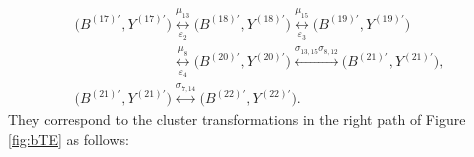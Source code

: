 \documentclass[pdftex]{sigma}
\newcommand\bY{Y}
\numberwithin{equation}{section}
\begin{document}
\begin{gather}
\bigl(B^{(17)\prime}, \bY^{(17)\prime}\bigr) \underset{\varepsilon_2}{\overset{\mu_{13}}{\longleftrightarrow} }
\bigl(B^{(18)\prime}, \bY^{(18)\prime}\bigr) \underset{\varepsilon_3}{\overset{\mu_{15}}{\longleftrightarrow} }
\bigl(B^{(19)\prime}, \bY^{(19)\prime}\bigr)\nonumber
\\
\phantom{\bigl(B^{(16)\prime}, \bY^{(16)\prime}\bigr)}{}
\underset{\varepsilon_4}{\overset{\mu_{8}}{\longleftrightarrow} }
\bigl(B^{(20)\prime}, \bY^{(20)\prime}\bigr) \overset{\sigma_{13,15}\sigma_{8,12}}{\longleftrightarrow}
\bigl(B^{(21)\prime}, \bY^{(21)\prime}\bigr),\nonumber
\\
\bigl(B^{(21)\prime}, \bY^{(21)\prime}\bigr) \overset{\sigma_{7,14}}{\longleftrightarrow}
\bigl(B^{(22)\prime}, \bY^{(22)\prime}\bigr).\label{b11R}
\end{gather}
They correspond to the cluster transformations in the right path of Figure \ref{fig:bTE} as follows:
\end{document}
